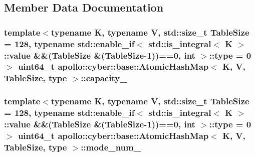 \subsection{Member Data Documentation}
\hypertarget{classapollo_1_1cyber_1_1base_1_1AtomicHashMap_ada585ac9c1211917c1d08bf3ef77281f}{
\subsubsection[{capacity\-\_\-}]{\setlength{\rightskip}{0pt plus 5cm}template$<$typename K, typename V, std\-::size\-\_\-t Table\-Size = 128, typename std\-::enable\-\_\-if$<$ std\-::is\-\_\-integral$<$ K $>$\-::value \&\&(\-Table\-Size \&(\-Table\-Size-\/1))==0, int $>$\-::type = 0$>$ uint64\-\_\-t {\bf apollo\-::cyber\-::base\-::\-Atomic\-Hash\-Map}$<$ K, V, Table\-Size, type $>$\-::capacity\-\_\-\hspace{0.3cm}{\ttfamily [private]}}}\label{classapollo_1_1cyber_1_1base_1_1AtomicHashMap_ada585ac9c1211917c1d08bf3ef77281f}
\hypertarget{classapollo_1_1cyber_1_1base_1_1AtomicHashMap_adb15b0fce4c41fa3b25a32b5ba7e23bc}{
\subsubsection[{mode\-\_\-num\-\_\-}]{\setlength{\rightskip}{0pt plus 5cm}template$<$typename K, typename V, std\-::size\-\_\-t Table\-Size = 128, typename std\-::enable\-\_\-if$<$ std\-::is\-\_\-integral$<$ K $>$\-::value \&\&(\-Table\-Size \&(\-Table\-Size-\/1))==0, int $>$\-::type = 0$>$ uint64\-\_\-t {\bf apollo\-::cyber\-::base\-::\-Atomic\-Hash\-Map}$<$ K, V, Table\-Size, type $>$\-::mode\-\_\-num\-\_\-\hspace{0.3cm}{\ttfamily [private]}}}\label{classapollo_1_1cyber_1_1base_1_1AtomicHashMap_adb15b0fce4c41fa3b25a32b5ba7e23bc}
